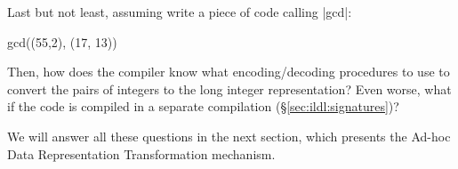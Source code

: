 Last but not least, assuming write a piece of code calling |gcd|:

\begin{lstlisting-nobreak}
gcd((55,2), (17, 13))
\end{lstlisting-nobreak}

Then, how does the compiler know what encoding/decoding procedures to use to convert the pairs of integers to the long integer representation? Even worse, what if the code is compiled in a separate compilation (\S\ref{sec:ildl:signatures})?

We will answer all these questions in the next section, which presents the Ad-hoc Data Representation Transformation mechanism.